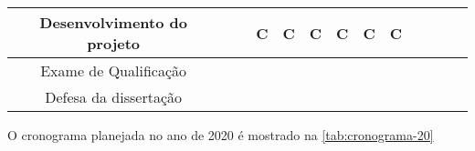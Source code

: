 \begin{table}[htb]
{\begin{tabular}{|c|c|c|c|c|c|c|c|c|c|c|c|c|}
			\hline
			Desenvolvimento do projeto
			&
			&
			& \cellcolor[HTML]{9AFF99}C
			& \cellcolor[HTML]{9AFF99}C
			& \cellcolor[HTML]{9AFF99}C
			& \cellcolor[HTML]{9AFF99}C
			& \cellcolor[HTML]{9AFF99}C
			& \cellcolor[HTML]{9AFF99}C \\ 
			
			\hline
			Exame de Qualificação
			&
			&
			&
			&
			&
			&
			&
			& \\
			
			\hline
			Defesa da dissertação
			&
			&
			&
			&
			&
			&
			&
			& \\
			\hline
			
		\end{tabular}}
	\end{table}

	O cronograma planejada no ano de 2020 é mostrado na \autoref{tab:cronograma-20}

